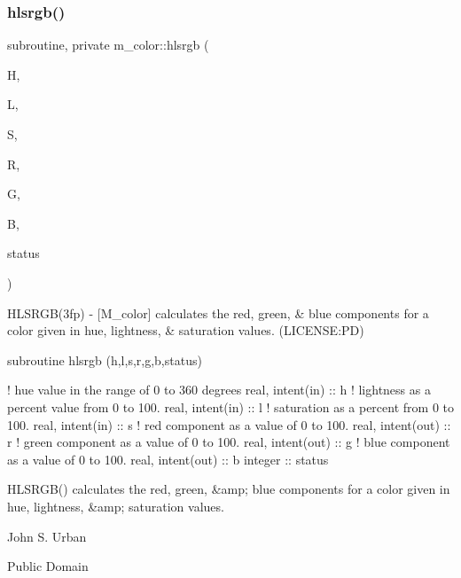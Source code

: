 \subsubsection{\texorpdfstring{hlsrgb()}{hlsrgb()}}
{\footnotesize\ttfamily subroutine, private m\+\_\+color\+::hlsrgb (\begin{DoxyParamCaption}\item[{real, intent(in)}]{H,  }\item[{real, intent(in)}]{L,  }\item[{real, intent(in)}]{S,  }\item[{real, intent(out)}]{R,  }\item[{real, intent(out)}]{G,  }\item[{real, intent(out)}]{B,  }\item[{integer}]{status }\end{DoxyParamCaption})\hspace{0.3cm}{\ttfamily [private]}}


\begin{DoxyDescription}
\item[\label{_HLSRGB}%
N\+A\+ME ]H\+L\+S\+R\+G\+B(3fp) -\/ \mbox{[}M\+\_\+color\mbox{]} calculates the red, green, \& blue components for a color given in hue, lightness, \& saturation values. (L\+I\+C\+E\+N\+SE\+:PD) 


\item[S\+Y\+N\+O\+P\+S\+IS ]
\begin{DoxyPre}
    subroutine hlsrgb (h,l,s,r,g,b,status)\end{DoxyPre}



\begin{DoxyPre}     ! hue value in the range of 0 to 360 degrees
     real, intent(in)  :: h
     ! lightness as a percent value from 0 to 100.
     real, intent(in)  :: l
     ! saturation as a percent from 0 to 100.
     real, intent(in)  :: s
     ! red component as a value of 0 to 100.
     real, intent(out) :: r
     ! green component as a value of 0 to 100.
     real, intent(out) :: g
     ! blue component as a value of 0 to 100.
     real, intent(out) :: b
     integer           :: status
    \end{DoxyPre}
 


\item[D\+E\+S\+C\+R\+I\+P\+T\+I\+ON ]\begin{DoxyVerb}HLSRGB() calculates the red, green, &amp; blue components for a
 color given in hue, lightness, &amp; saturation values.
\end{DoxyVerb}
 


\item[A\+U\+T\+H\+OR ]

John S. Urban




\item[L\+I\+C\+E\+N\+SE ]

Public Domain




\end{DoxyDescription}

